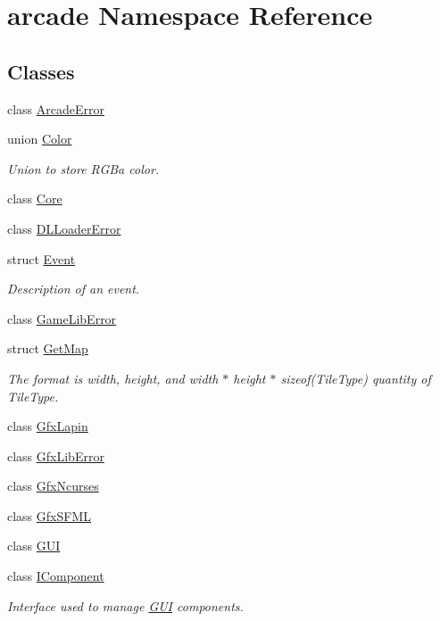 \hypertarget{namespacearcade}{}\section{arcade Namespace Reference}
\label{namespacearcade}
\subsection*{Classes}
\begin{DoxyCompactItemize}
\item 
class \hyperlink{classarcade_1_1_arcade_error}{Arcade\+Error}
\item 
union \hyperlink{unionarcade_1_1_color}{Color}
\begin{DoxyCompactList}\small\item\em Union to store R\+G\+Ba color. \end{DoxyCompactList}\item 
class \hyperlink{classarcade_1_1_core}{Core}
\item 
class \hyperlink{classarcade_1_1_d_l_loader_error}{D\+L\+Loader\+Error}
\item 
struct \hyperlink{structarcade_1_1_event}{Event}
\begin{DoxyCompactList}\small\item\em Description of an event. \end{DoxyCompactList}\item 
class \hyperlink{classarcade_1_1_game_lib_error}{Game\+Lib\+Error}
\item 
struct \hyperlink{structarcade_1_1_get_map}{Get\+Map}
\begin{DoxyCompactList}\small\item\em The format is width, height, and width $\ast$ height $\ast$ sizeof(\+Tile\+Type) quantity of Tile\+Type. \end{DoxyCompactList}\item 
class \hyperlink{classarcade_1_1_gfx_lapin}{Gfx\+Lapin}
\item 
class \hyperlink{classarcade_1_1_gfx_lib_error}{Gfx\+Lib\+Error}
\item 
class \hyperlink{classarcade_1_1_gfx_ncurses}{Gfx\+Ncurses}
\item 
class \hyperlink{classarcade_1_1_gfx_s_f_m_l}{Gfx\+S\+F\+ML}
\item 
class \hyperlink{classarcade_1_1_g_u_i}{G\+UI}
\item 
class \hyperlink{classarcade_1_1_i_component}{I\+Component}
\begin{DoxyCompactList}\small\item\em Interface used to manage \hyperlink{classarcade_1_1_g_u_i}{G\+UI} components. \end{DoxyCompactList}\item 

\end{DoxyCompactItemize}
